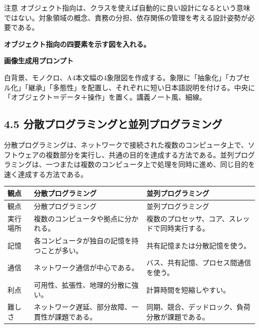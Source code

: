 \documentclass[a4paper,11pt]{ltjsarticle}
\begin{document}
\begin{importantbox}{注意}
オブジェクト指向は、クラスを使えば自動的に良い設計になるという意味ではない。対象領域の概念、責務の分担、依存関係の管理を考える設計姿勢が必要である。

\end{importantbox}

\begin{todobox}
\textbf{オブジェクト指向の四要素を示す図を入れる。}\par
\textbf{画像生成用プロンプト}\par
白背景、モノクロ、A4本文幅の4象限図を作成する。象限に「抽象化」「カプセル化」「継承」「多態性」を配置し、それぞれに短い日本語説明を付ける。中央に「オブジェクト＝データ＋操作」を置く。講義ノート風、細線。

\end{todobox}

\subsection{4.5 分散プログラミングと並列プログラミング}

分散プログラミングは、ネットワークで接続された複数のコンピュータ上で、ソフトウェアの複数部分を実行し、共通の目的を達成する方法である。並列プログラミングは、一つまたは複数のコンピュータ上で処理を同時に進め、同じ目的を速く達成する方法である。

\begin{longtable}{>{\raggedright\arraybackslash}p{}>{\raggedright\arraybackslash}p{}>{\raggedright\arraybackslash}p{}}
\toprule
観点 & 分散プログラミング & 並列プログラミング \\
\midrule
\endfirsthead
\toprule
観点 & 分散プログラミング & 並列プログラミング \\
\midrule
\endhead
実行場所 & 複数のコンピュータや拠点に分かれる。 & 複数のプロセッサ、コア、スレッドで同時実行する。 \\
記憶 & 各コンピュータが独自の記憶を持つことが多い。 & 共有記憶または分散記憶を使う。 \\
通信 & ネットワーク通信が中心である。 & バス、共有記憶、プロセス間通信を使う。 \\
利点 & 可用性、拡張性、地理的分散に強い。 & 計算時間を短縮しやすい。 \\
難しさ & ネットワーク遅延、部分故障、一貫性が課題である。 & 同期、競合、デッドロック、負荷分散が課題である。 \\
\bottomrule
\end{longtable}
\end{document}
